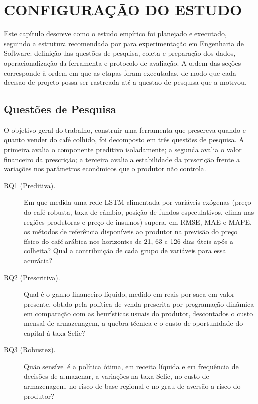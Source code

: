\chapter{\MakeUppercase{Configuração do Estudo}}\label{sec:configuracao}

Este capítulo descreve como o estudo empírico foi planejado e executado, seguindo a estrutura recomendada por  para experimentação em Engenharia de Software: definição das questões de pesquisa, coleta e preparação dos dados, operacionalização da ferramenta e protocolo de avaliação. A ordem das seções corresponde à ordem em que as etapas foram executadas, de modo que cada decisão de projeto possa ser rastreada até a questão de pesquisa que a motivou.

\section{Questões de Pesquisa}\label{sec2:rqs}

O objetivo geral do trabalho, construir uma ferramenta que prescreva quando e quanto vender do café colhido, foi decomposto em três questões de pesquisa. A primeira avalia o componente preditivo isoladamente; a segunda avalia o valor financeiro da prescrição; a terceira avalia a estabilidade da prescrição frente a variações nos parâmetros econômicos que o produtor não controla.

\begin{description}
	\item[RQ1 (Preditiva).] Em que medida uma rede LSTM alimentada por variáveis exógenas (preço do café robusta, taxa de câmbio, posição de fundos especulativos, clima nas regiões produtoras e preço de insumos) supera, em RMSE, MAE e MAPE, os métodos de referência disponíveis ao produtor na previsão do preço físico do café arábica nos horizontes de 21, 63 e 126 dias úteis após a colheita? Qual a contribuição de cada grupo de variáveis para essa acurácia?
	\item[RQ2 (Prescritiva).] Qual é o ganho financeiro líquido, medido em reais por saca em valor presente, obtido pela política de venda prescrita por programação dinâmica em comparação com as heurísticas usuais do produtor, descontados o custo mensal de armazenagem, a quebra técnica e o custo de oportunidade do capital à taxa Selic?
	\item[RQ3 (Robustez).] Quão sensível é a política ótima, em receita líquida e em frequência de decisões de armazenar, a variações na taxa Selic, no custo de armazenagem, no risco de base regional e no grau de aversão a risco do produtor?
\end{description}

